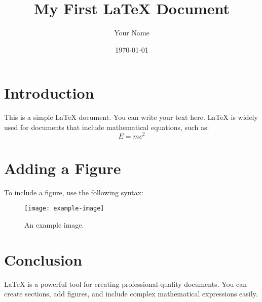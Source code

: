 \documentclass[12pt]{article}  %
\title{My First LaTeX Document}  %
\author{Your Name}              %
\date{\today}                   %
\begin{document}
\maketitle  %

\section{Introduction}  %
This is a simple LaTeX document. You can write your text here. 
LaTeX is widely used for documents that include mathematical equations, such as:
\[
E = mc^2
\]

\section{Adding a Figure}
To include a figure, use the following syntax:
\begin{figure}[h]
    \centering
    \texttt{[image: example-image]} %
    \caption{An example image.}
\end{figure}

\section{Conclusion}
LaTeX is a powerful tool for creating professional-quality documents. You can create sections, add figures, and include complex mathematical expressions easily.
\end{document}
